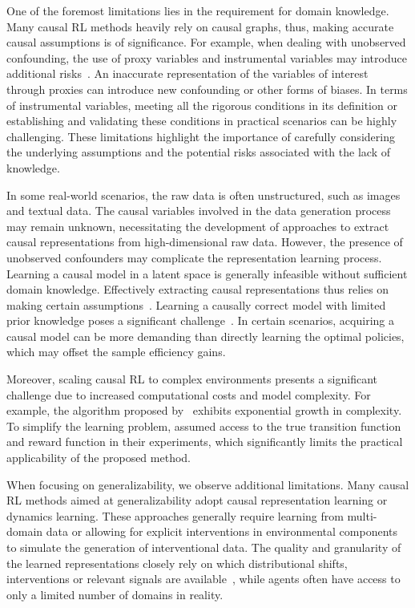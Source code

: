 \documentclass[10pt]{article} %
\theoremstyle{definition}
\begin{document}
One of the foremost limitations lies in the requirement for domain knowledge. Many causal RL methods heavily rely on causal graphs, thus, making accurate causal assumptions is of significance. For example, when dealing with unobserved confounding, the use of proxy variables and instrumental variables may introduce additional risks~\citep{martensInstrumentalVariablesApplication2006,sainaniInstrumentalVariablesUses2018,cuiSemiparametricProximalCausal2023}. An inaccurate representation of the variables of interest through proxies can introduce new confounding or other forms of biases. In terms of instrumental variables, meeting all the rigorous conditions in its definition or establishing and validating these conditions in practical scenarios can be highly challenging. These limitations highlight the importance of carefully considering the underlying assumptions and the potential risks associated with the lack of knowledge.

In some real-world scenarios, the raw data is often unstructured, such as images and textual data. The causal variables involved in the data generation process may remain unknown, necessitating the development of approaches to extract causal representations from high-dimensional raw data. However, the presence of unobserved confounders may complicate the representation learning process. Learning a causal model in a latent space is generally infeasible without sufficient domain knowledge. Effectively extracting causal representations thus relies on making certain assumptions~\citep{scholkopfCausalRepresentationLearning2021a}. Learning a causally correct model with limited prior knowledge poses a significant challenge~\citep{rezendeCausallyCorrectPartial2020a}. In certain scenarios, acquiring a causal model can be more demanding than directly learning the optimal policies, which may offset the sample efficiency gains.

Moreover, scaling causal RL to complex environments presents a significant challenge due to increased computational costs and model complexity. For example, the algorithm proposed by~\citet{sontakkeCausalCuriosityRL2021a} exhibits exponential growth in complexity. To simplify the learning problem, \citet{buesingWouldaCouldaShoulda2019a} assumed access to the true transition function and reward function in their experiments, which significantly limits the practical applicability of the proposed method. 

When focusing on generalizability, we observe additional limitations. Many causal RL methods aimed at generalizability adopt causal representation learning or dynamics learning. These approaches generally require learning from multi-domain data or allowing for explicit interventions in environmental components to simulate the generation of interventional data. The quality and granularity of the learned representations closely rely on which distributional shifts, interventions or relevant signals are available~\citep{scholkopfCausalRepresentationLearning2021a}, while agents often have access to only a limited number of domains in reality.
\end{document}

